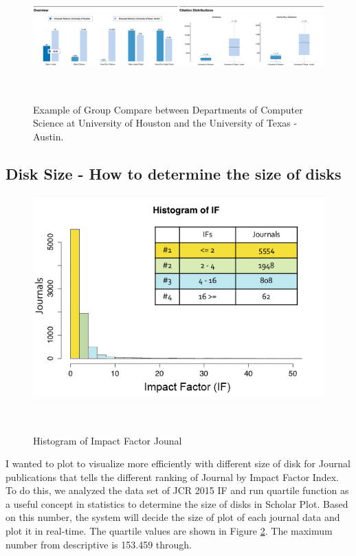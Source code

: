 \begin{figure}
  \centering
  \includegraphics[width=1\textwidth]{figures/fig-GroupCompare}
  \caption{Example of Group Compare between Departments of Computer Science at University of Houston and the University of Texas - Austin.}~\label{fig:groupcompare}
\end{figure}




\subsection{Disk Size - How to determine the size of disks}

\begin{figure}[!htb]
  \centering
  \includegraphics[width=1\textwidth]{figures/fig-Histogram-IF}
  \caption{Histogram of Impact Factor Jounal}~\label{fig:Histogram-IF}
\end{figure}

I wanted to plot to visualize more efficiently with different size of disk for Journal publications that tells the different ranking of Journal by Impact Factor Index. To do this, we analyzed the data set of JCR 2015 IF and run quartile function as a useful concept in statistics to determine the size of disks in Scholar Plot. Based on this number, the system will decide the size of plot of each journal data and plot it in real-time. The quartile values are shown in Figure \ref{fig:Histogram-IF}. The maximum number from descriptive is 153.459 through.





